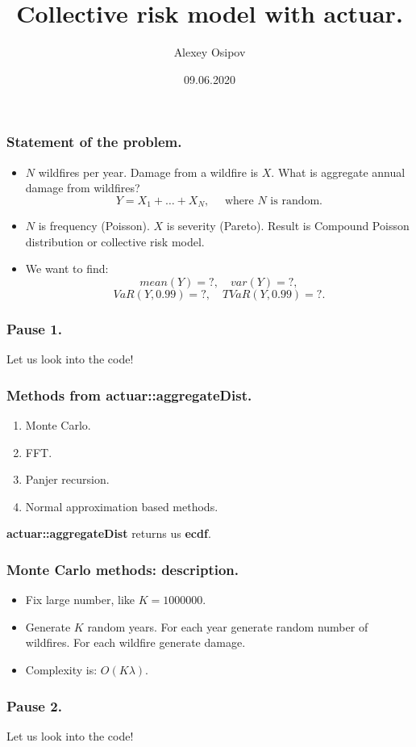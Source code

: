 \documentclass{beamer}
\title{Collective risk model with \textbf{actuar}.}
\author{Alexey Osipov}
\date{09.06.2020}
\begin{document}
\maketitle
\begin{frame}[fragile]
\frametitle{Statement of the problem.}
\begin{itemize}
\item $N$ wildfires per year. Damage from a wildfire is $X$. What is aggregate annual damage from wildfires?
$$Y=X_1 + \ldots + X_N,\quad \textrm{ where }N\textrm{ is random.}$$
\item $N$ is frequency (Poisson).
$X$ is severity (Pareto).
Result is Compound Poisson distribution or collective risk model.
\item We want to find:
$$mean(Y)=?,\quad var(Y)=?,$$
$$VaR(Y, 0.99) = ?,\quad TVaR(Y, 0.99) = ?.$$
\end{itemize}
\end{frame}
\begin{frame}[fragile]
\frametitle{Pause 1.}
\begin{center}
Let us look into the code!
\end{center}
\end{frame}
\begin{frame}[fragile]
\frametitle{Methods from \textbf{actuar::aggregateDist}.}
\begin{enumerate}
	\item Monte Carlo.
	\item FFT.
	\item Panjer recursion.
	\item Normal approximation based methods.
\end{enumerate}

\textbf{actuar::aggregateDist} returns us \textbf{ecdf}.
\end{frame}
\begin{frame}[fragile]
\frametitle{Monte Carlo methods: description.}
\begin{itemize}
	\item Fix large number, like $K = 1000000$.
	\item Generate $K$ random years. For each year generate random number of wildfires. For each wildfire generate damage.
	\item Complexity is: $O(K\lambda)$.
\end{itemize}
\end{frame}
\begin{frame}[fragile]
\frametitle{Pause 2.}
\begin{center}
Let us look into the code!
\end{center}
\end{frame}
\end{document}
